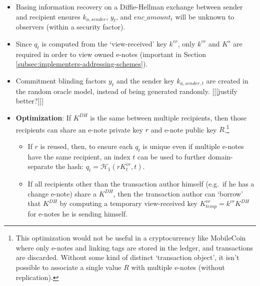 \begin{itemize}
    \item Basing information recovery on a Diffie-Hellman exchange between sender and recipient ensures $k_{a,sender}$, $y_t$, and $enc\_amount_t$ will be unknown to observers (within a security factor).

    \item Since $q_t$ is computed from the `view-received' key $k^{vr}$, only $k^{vr}$ and $K^s$ are required in order to view owned e-notes (important in Section \ref{subsec:implementers-addressing-schemes}).

    \item Commitment blinding factors $y_t$ and the sender key $k_{a,sender,t}$ are created in the random oracle model, instead of being generated randomly. [[[justify better?]]]


    \item \textbf{Optimization}: If $K^{DH}$ is the same between multiple recipients, then those recipients can share an e-note private key $r$ and e-note public key $R$.\footnote{This optimization would not be useful in a cryptocurrency like MobileCoin where only e-notes and linking tags are stored in the ledger, and transactions are discarded. Without some kind of distinct `transaction object', it isn't possible to associate a single value $R$ with multiple e-notes (without replication).}

    \begin{itemize}
        \item If $r$ is reused, then, to ensure each $q_t$ is unique even if multiple e-notes have the same recipient, an index $t$ can be used to further domain-separate the hash: $q_t = \mathcal{H}_1(r K^{vr}_t, t)$.

        \item If all recipients other than the transaction author himself (e.g.\ if he has a change e-note) share a $K^{DH}$, then the transaction author can `borrow' that $K^{DH}$ by computing a temporary view-received key $K^{vr}_{temp} = k^{vr} K^{DH}$ for e-notes he is sending himself.
    \end{itemize}


\end{itemize}
